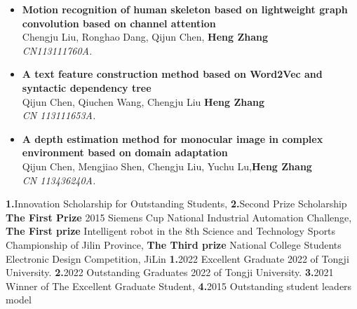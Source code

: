\documentclass{resume}
\begin{document}
\begin{itemize}
\item \textbf{Motion recognition of human skeleton based on lightweight graph convolution based on channel attention}\quad {}\\
  \footnotesize{ Chengju Liu, Ronghao Dang, Qijun Chen, \textbf{Heng Zhang}}\\
  \footnotesize{\textit{ CN113111760A.}}
  
\item \textbf{A text feature construction method based on Word2Vec and syntactic dependency tree}\quad {}\\
  \footnotesize{ Qijun Chen, Qiuchen Wang, Chengju Liu \textbf{Heng Zhang}}\\
  \footnotesize{\textit{ CN 113111653A.}}\\
  
\item \textbf{A depth estimation method for monocular image in complex environment based on domain adaptation}\quad {}\\
  \footnotesize{ Qijun Chen, Mengjiao Shen, Chengju Liu, Yuchu Lu,\textbf{Heng Zhang}}\\
  \footnotesize{\textit{ CN 113436240A.}}\\
       
\end{itemize}

\begin{competences}[6em]
  {
    \textbf{1.}Innovation Scholarship for Outstanding Students,
    \textbf{2.}Second Prize Scholarship
  }
  {%
    \textbf{The First Prize} 2015 Siemens Cup National Industrial Automation Challenge,
    \textbf{The First prize} Intelligent robot in the 8th Science and Technology Sports Championship of Jilin Province,
    \textbf{The Third prize} National College Students Electronic Design Competition, JiLin
  }
  {%
  \textbf{1.}2022 Excellent Graduate 2022 of Tongji University.
  \textbf{2.}2022 Outstanding Graduates 2022 of Tongji University.
  \textbf{3.}2021 Winner of The Excellent Graduate Student,
  \textbf{4.}2015 Outstanding student leaders model
  }

\end{competences}
\end{document}
